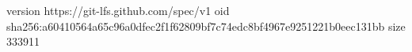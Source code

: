 version https://git-lfs.github.com/spec/v1
oid sha256:a60410564a65c96a0dfec2f1f62809bf7c74edc8bf4967e9251221b0eec131bb
size 333911
